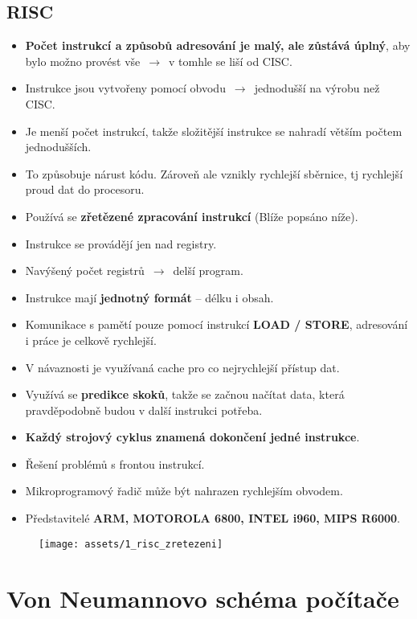 \subsection{RISC}
\begin{itemize}
    \item {\textbf{Počet instrukcí a způsobů adresování je malý, ale zůstává úplný}, aby bylo možno provést vše $\,\to\,$ v tomhle se liší od CISC}.
    \item {Instrukce jsou vytvořeny pomocí obvodu $\,\to\,$ jednodušší na výrobu než CISC}.
    \item Je menší počet instrukcí, takže složitější instrukce se nahradí větším počtem jednodušších.
    \item To způsobuje nárust kódu. Zároveň ale vznikly rychlejší sběrnice, tj rychlejší proud dat do procesoru.
    \item {Používá se \textbf{zřetězené zpracování instrukcí} (Blíže popsáno níže)}.
    \item {Instrukce se provádějí jen nad registry}.
    \item {Navýšený počet registrů $\,\to\,$ delší program}.
    \item {Instrukce mají \textbf{jednotný formát} -- délku i obsah}.
    \item {Komunikace s pamětí pouze pomocí instrukcí \textbf{LOAD / STORE}, adresování i práce je celkově rychlejší}.
    \item V návaznosti je využívaná cache pro co nejrychlejší přístup dat.
    \item Využívá se \textbf{predikce skoků}, takže se začnou načítat data, která pravděpodobně budou v další instrukci potřeba.
    \item {\textbf{Každý strojový cyklus znamená dokončení jedné instrukce}}.
    \item {Řešení problémů s frontou instrukcí}.
    \item {Mikroprogramový řadič může být nahrazen rychlejším obvodem}.
    \item {Představitelé \textbf{ARM, MOTOROLA 6800, INTEL i960, MIPS R6000}}.
\end{itemize}
\begin{figure}[H]
    \centering
    \texttt{[image: assets/1\_risc\_zretezeni]}
\end{figure}

\section{Von Neumannovo schéma počítače}

